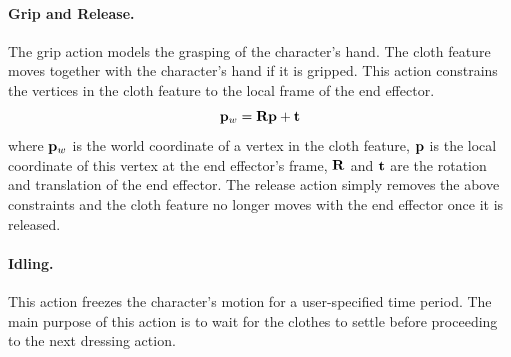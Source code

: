 \paragraph{Grip and Release.}
The grip action models the grasping of the character's hand. The cloth feature moves together with the character's hand if it is gripped. This action constrains the vertices in the cloth feature to the local frame of the end effector.
\begin{displaymath}
\mathbf{p}_w = \mathbf{Rp} + \mathbf{t}
\end{displaymath}
where $\mathbf{p}_w$ is the world coordinate of a vertex in the cloth feature, $\mathbf{p}$ is the local coordinate of this vertex at the end effector's frame, $\mathbf{R}$ and $\mathbf{t}$ are the rotation and translation of the end effector. The release action simply removes the above constraints and the cloth feature no longer moves with the end effector once it is released.

\paragraph{Idling.} This action freezes the character's motion for a user-specified time period. The main purpose of this action is to wait for the clothes to settle before proceeding to the next dressing action.

